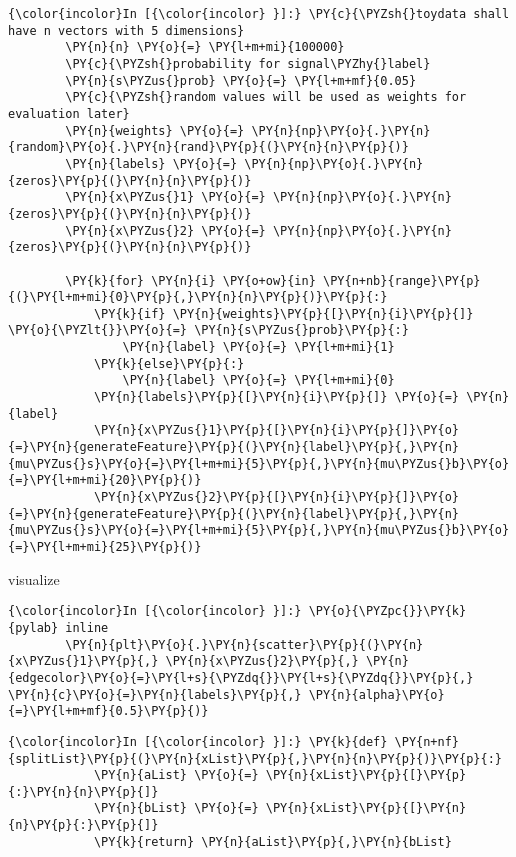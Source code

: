    \begin{Verbatim}[commandchars=\\\{\}]
{\color{incolor}In [{\color{incolor} }]:} \PY{c}{\PYZsh{}toydata shall have n vectors with 5 dimensions}
        \PY{n}{n} \PY{o}{=} \PY{l+m+mi}{100000}
        \PY{c}{\PYZsh{}probability for signal\PYZhy{}label}
        \PY{n}{s\PYZus{}prob} \PY{o}{=} \PY{l+m+mf}{0.05}
        \PY{c}{\PYZsh{}random values will be used as weights for evaluation later}
        \PY{n}{weights} \PY{o}{=} \PY{n}{np}\PY{o}{.}\PY{n}{random}\PY{o}{.}\PY{n}{rand}\PY{p}{(}\PY{n}{n}\PY{p}{)}
        \PY{n}{labels} \PY{o}{=} \PY{n}{np}\PY{o}{.}\PY{n}{zeros}\PY{p}{(}\PY{n}{n}\PY{p}{)}
        \PY{n}{x\PYZus{}1} \PY{o}{=} \PY{n}{np}\PY{o}{.}\PY{n}{zeros}\PY{p}{(}\PY{n}{n}\PY{p}{)}
        \PY{n}{x\PYZus{}2} \PY{o}{=} \PY{n}{np}\PY{o}{.}\PY{n}{zeros}\PY{p}{(}\PY{n}{n}\PY{p}{)}
        
        \PY{k}{for} \PY{n}{i} \PY{o+ow}{in} \PY{n+nb}{range}\PY{p}{(}\PY{l+m+mi}{0}\PY{p}{,}\PY{n}{n}\PY{p}{)}\PY{p}{:}
            \PY{k}{if} \PY{n}{weights}\PY{p}{[}\PY{n}{i}\PY{p}{]} \PY{o}{\PYZlt{}}\PY{o}{=} \PY{n}{s\PYZus{}prob}\PY{p}{:}
                \PY{n}{label} \PY{o}{=} \PY{l+m+mi}{1}
            \PY{k}{else}\PY{p}{:}
                \PY{n}{label} \PY{o}{=} \PY{l+m+mi}{0}
            \PY{n}{labels}\PY{p}{[}\PY{n}{i}\PY{p}{]} \PY{o}{=} \PY{n}{label}
            \PY{n}{x\PYZus{}1}\PY{p}{[}\PY{n}{i}\PY{p}{]}\PY{o}{=}\PY{n}{generateFeature}\PY{p}{(}\PY{n}{label}\PY{p}{,}\PY{n}{mu\PYZus{}s}\PY{o}{=}\PY{l+m+mi}{5}\PY{p}{,}\PY{n}{mu\PYZus{}b}\PY{o}{=}\PY{l+m+mi}{20}\PY{p}{)}
            \PY{n}{x\PYZus{}2}\PY{p}{[}\PY{n}{i}\PY{p}{]}\PY{o}{=}\PY{n}{generateFeature}\PY{p}{(}\PY{n}{label}\PY{p}{,}\PY{n}{mu\PYZus{}s}\PY{o}{=}\PY{l+m+mi}{5}\PY{p}{,}\PY{n}{mu\PYZus{}b}\PY{o}{=}\PY{l+m+mi}{25}\PY{p}{)}
\end{Verbatim}

    visualize

    \begin{Verbatim}[commandchars=\\\{\}]
{\color{incolor}In [{\color{incolor} }]:} \PY{o}{\PYZpc{}}\PY{k}{pylab} inline
        \PY{n}{plt}\PY{o}{.}\PY{n}{scatter}\PY{p}{(}\PY{n}{x\PYZus{}1}\PY{p}{,} \PY{n}{x\PYZus{}2}\PY{p}{,} \PY{n}{edgecolor}\PY{o}{=}\PY{l+s}{\PYZdq{}}\PY{l+s}{\PYZdq{}}\PY{p}{,} \PY{n}{c}\PY{o}{=}\PY{n}{labels}\PY{p}{,} \PY{n}{alpha}\PY{o}{=}\PY{l+m+mf}{0.5}\PY{p}{)}
\end{Verbatim}

    \begin{Verbatim}[commandchars=\\\{\}]
{\color{incolor}In [{\color{incolor} }]:} \PY{k}{def} \PY{n+nf}{splitList}\PY{p}{(}\PY{n}{xList}\PY{p}{,}\PY{n}{n}\PY{p}{)}\PY{p}{:}
            \PY{n}{aList} \PY{o}{=} \PY{n}{xList}\PY{p}{[}\PY{p}{:}\PY{n}{n}\PY{p}{]}
            \PY{n}{bList} \PY{o}{=} \PY{n}{xList}\PY{p}{[}\PY{n}{n}\PY{p}{:}\PY{p}{]}
            \PY{k}{return} \PY{n}{aList}\PY{p}{,}\PY{n}{bList}
\end{Verbatim}

